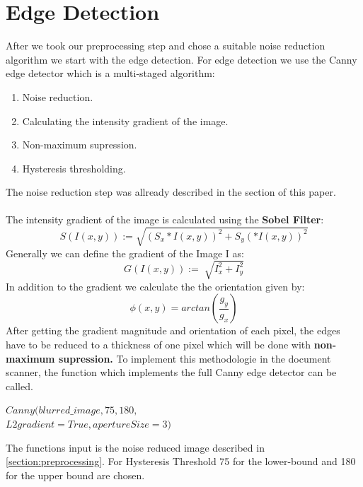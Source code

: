 \documentclass[twocolumn,10pt]{asme2ej}
\begin{document}
\section{Edge Detection}
\noindent
After we took our preprocessing step and chose a suitable noise reduction algorithm 
we start with the edge detection.
For edge detection we use the Canny edge\cite{canny_paper} detector which is a multi-staged algorithm:
\begin{enumerate}
    \item Noise reduction.
    \item Calculating the intensity gradient of the image.
    \item Non-maximum supression.
    \item Hysteresis thresholding.
\end{enumerate}
The noise reduction step was allready described in the  section of this paper.
\\\\
The intensity gradient of the image is calculated using the \textbf{Sobel Filter}:
\begin{equation}
    S(I(x,y)) :=\sqrt{(S_x*I(x,y))^2 + S_y(*I(x,y))^2}
\end{equation}
Generally we can define the gradient of the Image I as:
\begin{equation}
    G(I(x,y)) := \sqrt[]{I_x^2 +I_y^2}
\end{equation}
\noindent
In addition to the gradient we calculate the the orientation given by:
\begin{equation}
    \phi(x,y) = arctan(\frac{g_y}{g_x})
\end{equation}
After getting the gradient magnitude and orientation of each pixel, the edges have
to be reduced to a thickness of one pixel which will be done with \textbf{non-maximum supression.}
\noindent
To implement this methodologie in the document scanner, the function
which implements the full Canny edge detector can be called.
\begin{center}
    \noindent
    $Canny(blurred\_image,75, 180,$\\
    $L2gradient = True, apertureSize = 3)$
\end{center}

 The functions input is the noise reduced image described in \ref{section:preprocessing}.
 For Hysteresis Threshold 75 for the lower-bound and 180 for the upper bound are chosen.
\end{document}
